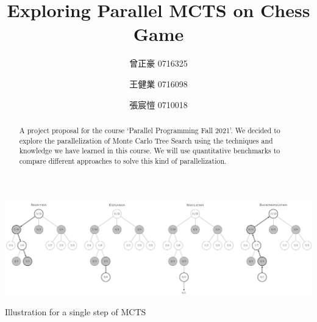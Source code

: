 \documentclass[sigconf]{acmart}
\begin{document}
\title{Exploring Parallel MCTS on Chess Game}


\author{曾正豪 0716325}

  \author{王健業 0716098}
  

\author{張宸愷 0710018}





\begin{abstract}
  A project proposal for the course `Parallel Programming Fall 2021'.
  We decided to explore the parallelization of Monte Carlo Tree Search using the techniques and knowledge we have learned in this course. We will use quantitative benchmarks to compare different approaches to solve this kind of parallelization. 
\end{abstract}





\begin{teaserfigure}
  \includegraphics[width=\textwidth]{MCTS-steps.png}
  \caption{Illustration for a single step of MCTS}
\label{fig:teaser}
\end{teaserfigure}
\end{document}

